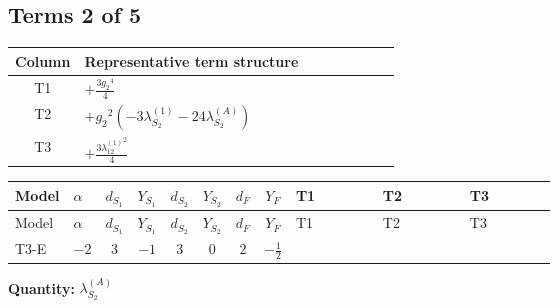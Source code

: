 \documentclass[8pt]{article}
\begin{document}
\begin{landscape}
\subsection*{Terms 2 of 5}
\begin{center}
\begin{tabular}{@{}c >{\raggedright\arraybackslash}p{0.82\linewidth}@{}}
\toprule
Column & Representative term structure \\
\midrule
T1 & \(\displaystyle +\frac{3 {g_2}^4}{4}\) \\
\midrule
T2 & \(\displaystyle +{g_2}^2 (-3 {\lambda_{S_2}^{(1)}}-24 {\lambda_{S_2}^{(A)}})\) \\
\midrule
T3 & \(\displaystyle +\frac{3 {\lambda_{12}^{(1)}}^2}{4}\) \\
\midrule
\bottomrule
\end{tabular}
\end{center}
\smallskip
\tiny
\begin{longtable}{@{}llcccccc >{\raggedright\arraybackslash}p{0.21\linewidth} >{\raggedright\arraybackslash}p{0.21\linewidth} >{\raggedright\arraybackslash}p{0.21\linewidth}@{}}
\toprule
Model & $\alpha$ & $d_{S_1}$ & $Y_{S_1}$ & $d_{S_2}$ & $Y_{S_2}$ & $d_F$ & $Y_F$ & T1 & T2 & T3 \\
\midrule
\endfirsthead
\toprule
Model & $\alpha$ & $d_{S_1}$ & $Y_{S_1}$ & $d_{S_2}$ & $Y_{S_2}$ & $d_F$ & $Y_F$ & T1 & T2 & T3 \\
\midrule
\endhead
T3-E & $-2$ & $3$ & $-1$ & $3$ & $0$ & $2$ & $-\frac{1}{2}$ & \scriptsize\adjustbox{max width=\linewidth}{$\begin{gathered} +\frac{3 {g_2}^4}{4}\end{gathered}$} & \scriptsize\adjustbox{max width=\linewidth}{$\begin{gathered} +{g_2}^2 (-3 {\lambda_{S_2}^{(1)}}-24 {\lambda_{S_2}^{(A)}})\end{gathered}$} & \scriptsize\adjustbox{max width=\linewidth}{$\begin{gathered} +\frac{3 {\lambda_{12}^{(1)}}^2}{4}\end{gathered}$} \\
\midrule
\bottomrule
\end{longtable}
\clearpage
\noindent\textbf{Quantity: }$\lambda_{S_2}^{(A)}$\par\smallskip

\end{landscape}
\end{document}
